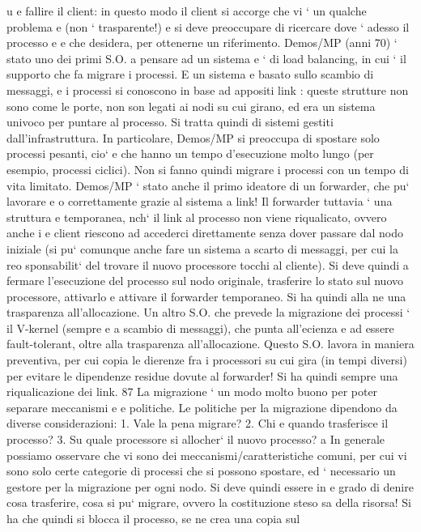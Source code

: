 \documentclass[a4paper,12pt]{article}
\begin{document}
u
e
fallire il client: in questo modo il client si accorge che vi ` un qualche problema
e
(non ` trasparente!) e si deve preoccupare di ricercare dove ` adesso il processo
e
e
che desidera, per ottenerne un riferimento.
Demos/MP (anni 70) ` stato uno dei primi S.O. a pensare ad un sistema
e
`
di load balancing, in cui ` il supporto che fa migrare i processi. E un sistema
e
basato sullo scambio di messaggi, e i processi si conoscono in base ad appositi
link : queste strutture non sono come le porte, non son legati ai nodi su cui
girano, ed era un sistema univoco per puntare al processo. Si tratta quindi di
sistemi gestiti dall'infrastruttura.
In particolare, Demos/MP si preoccupa di spostare solo processi pesanti, cio`
e
che hanno un tempo d'esecuzione molto lungo (per esempio, processi ciclici).
Non si fanno quindi migrare i processi con un tempo di vita limitato.
Demos/MP ` stato anche il primo ideatore di un forwarder, che pu` lavorare
e
o
correttamente grazie al sistema a link! Il forwarder tuttavia ` una struttura
e
temporanea, nch` il link al processo non viene riqualicato, ovvero anche i
e
client riescono ad accederci direttamente senza dover passare dal nodo iniziale
(si pu` comunque anche fare un sistema a scarto di messaggi, per cui la reo
sponsabilit` del trovare il nuovo processore tocchi al cliente). Si deve quindi
a
fermare l'esecuzione del processo sul nodo originale, trasferire lo stato sul nuovo
processore, attivarlo e attivare il forwarder temporaneo. Si ha quindi alla ne
una trasparenza all'allocazione.
Un altro S.O. che prevede la migrazione dei processi ` il V-kernel (sempre
e
a scambio di messaggi), che punta all'ecienza e ad essere fault-tolerant, oltre
alla trasparenza all'allocazione. Questo S.O. lavora in maniera preventiva, per
cui copia le dierenze fra i processori su cui gira (in tempi diversi) per evitare
le dipendenze residue dovute al forwarder! Si ha quindi sempre una riqualicazione dei link.
87
\newpage
La migrazione ` un modo molto buono per poter separare meccanismi e
e
politiche. Le politiche per la migrazione dipendono da diverse considerazioni:
1. Vale la pena migrare?
2. Chi e quando trasferisce il processo?
3. Su quale processore si allocher` il nuovo processo?
a
In generale possiamo osservare che vi sono dei meccanismi/caratteristiche comuni, per cui vi sono solo certe categorie
di processi che si possono spostare, ed
` necessario un gestore per la migrazione per ogni nodo. Si deve quindi essere in
e
grado di denire cosa trasferire, cosa si pu` migrare, ovvero la costituzione steso
sa della risorsa! Si ha che quindi si blocca il processo, se ne crea una copia sul
\end{document}
